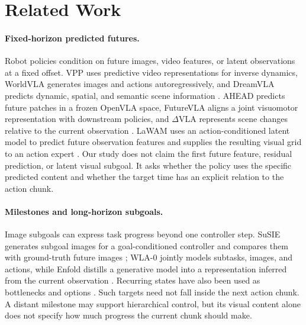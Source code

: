 \section{Related Work}\label{sec:related}

\paragraph{Fixed-horizon predicted futures.}
Robot policies condition on future images, video features, or latent
observations at a fixed offset.  VPP uses predictive video representations for
inverse dynamics, WorldVLA generates images and actions autoregressively, and
DreamVLA predicts dynamic, spatial, and semantic scene information
\citep{vpp2024,worldvla2025,dreamvla2025}.  AHEAD predicts future patches in a
frozen OpenVLA space, FutureVLA aligns a joint visuomotor representation with
downstream policies, and $\Delta$VLA represents scene changes relative to the
current observation \citep{ahead2026,futurevla2026,deltavla2026}.  LaWAM uses
an action-conditioned latent model to predict future observation features and
supplies the resulting visual grid to an action expert \citep{lawam2026}.  Our
study does not claim the first future feature, residual prediction, or latent
visual subgoal.  It asks whether the policy uses the specific predicted content
and whether the target time has an explicit relation to the action chunk.

\paragraph{Milestones and long-horizon subgoals.}
Image subgoals can express task progress beyond one controller step.  SuSIE
generates subgoal images for a goal-conditioned controller and compares them
with ground-truth future images \citep{susie2024}; WLA-0 jointly models
subtasks, images, and actions, while Enfold distills a generative model into a
representation inferred from the current observation
\citep{wla02026,enfold2026}.  Recurring states have also been used as
bottlenecks and options \citep{simsek2009,options1999}.  Such targets need not
fall inside the next action chunk.  A distant milestone may support
hierarchical control, but its visual content alone does not specify how much
progress the current chunk should make.

